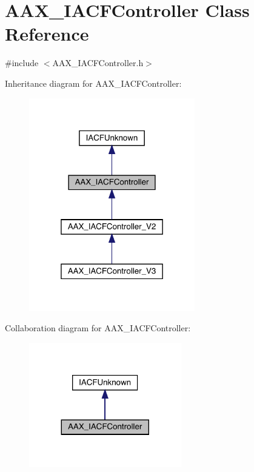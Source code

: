 \hypertarget{a01637}{}\section{A\+A\+X\+\_\+\+I\+A\+C\+F\+Controller Class Reference}
\label{a01637}


{\ttfamily \#include $<$A\+A\+X\+\_\+\+I\+A\+C\+F\+Controller.\+h$>$}



Inheritance diagram for A\+A\+X\+\_\+\+I\+A\+C\+F\+Controller\+:
\nopagebreak
\begin{figure}[H]
\begin{center}
\leavevmode
\includegraphics[width=205pt]{a01636}
\end{center}
\end{figure}


Collaboration diagram for A\+A\+X\+\_\+\+I\+A\+C\+F\+Controller\+:
\nopagebreak
\begin{figure}[H]
\begin{center}
\leavevmode
\includegraphics[width=188pt]{a01635}
\end{center}
\end{figure}


